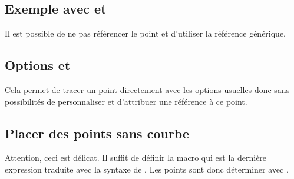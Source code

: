 \newpage
\subsection{Exemple avec  et }
Il est possible de ne pas référencer le point et d'utiliser la référence générique.

\begin{tkzexample}[latex=7cm,small] 
\end{tkzexample}

\subsection{Options  et } 
Cela permet de tracer un point directement avec les options usuelles donc sans possibilités de personnaliser et d'attribuer une référence à ce point.

\begin{tkzexample}[latex=7cm,small]
\end{tkzexample} 

\newpage
\subsection{Placer des points sans courbe} 
Attention, ceci est délicat. Il suffit de définir la macro  qui est la dernière expression traduite avec la syntaxe de . Les points sont donc déterminer avec .
  
\begin{tkzexample}[]
\end{tkzexample}
  
